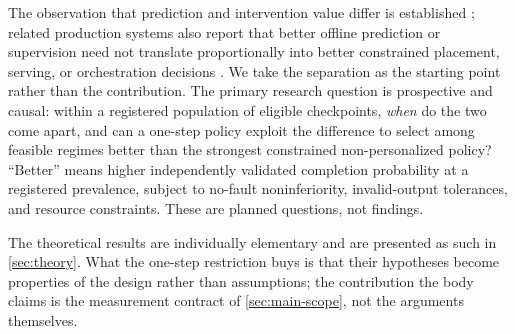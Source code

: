 The observation that prediction and intervention value differ is established
\citep{interventionparadox2026,calibrationnotcontrol2026}; related production
systems also report that better offline prediction or supervision need not
translate proportionally into better constrained placement, serving, or
orchestration decisions \citep{fleda2026,staleness2026,ajs2026,gstar2026}.
We take the separation as the starting point rather than the contribution.  The
primary research question is
prospective and causal: within a registered population of eligible checkpoints,
\emph{when} do the two come apart, and can a one-step policy exploit the
difference to select among feasible regimes better than the strongest
constrained non-personalized policy?  ``Better'' means higher independently
validated completion probability at a registered prevalence, subject to
no-fault noninferiority, invalid-output tolerances, and resource constraints.
These are planned questions, not findings.

The theoretical results are individually elementary and are presented as such in
\cref{sec:theory}.  What the one-step restriction buys is that their hypotheses
become properties of the design rather than assumptions; the contribution the
body claims is the measurement contract of \cref{sec:main-scope}, not the
arguments themselves.
